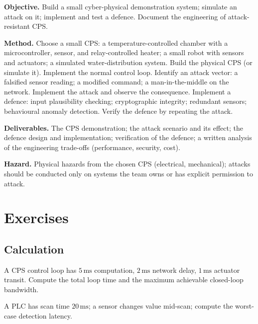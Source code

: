 \begin{project}
\textbf{Objective.} Build a small cyber-physical demonstration system; simulate an attack on it; implement and test a defence. Document the engineering of attack-resistant CPS.

\textbf{Method.} Choose a small CPS: a temperature-controlled chamber with a microcontroller, sensor, and relay-controlled heater; a small robot with sensors and actuators; a simulated water-distribution system. Build the physical CPS (or simulate it). Implement the normal control loop. Identify an attack vector: a falsified sensor reading; a modified command; a man-in-the-middle on the network. Implement the attack and observe the consequence. Implement a defence: input plausibility checking; cryptographic integrity; redundant sensors; behavioural anomaly detection. Verify the defence by repeating the attack.

\textbf{Deliverables.} The CPS demonstration; the attack scenario and its effect; the defence design and implementation; verification of the defence; a written analysis of the engineering trade-offs (performance, security, cost).

\textbf{Hazard.} Physical hazards from the chosen CPS (electrical, mechanical); attacks should be conducted only on systems the team owns or has explicit permission to attack.
\end{project}

\section{Exercises}

\subsection*{Calculation}

\begin{exercise}
A CPS control loop has $5\,\text{ms}$ computation, $2\,\text{ms}$ network delay, $1\,\text{ms}$ actuator transit. Compute the total loop time and the maximum achievable closed-loop bandwidth.
\end{exercise}

\begin{exercise}
A PLC has scan time $20\,\text{ms}$; a sensor changes value mid-scan; compute the worst-case detection latency.
\end{exercise}

